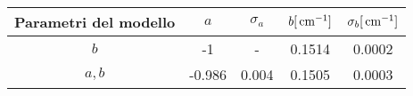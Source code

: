 \begin{tabulary}{\textwidth}{CCCCC}
\toprule
Parametri del modello & $a$  & $\sigma_a$ & $b [\,\mathrm{cm}^{-1}]$ & $\sigma_b [\,\mathrm{cm}^{-1}]$\\ \midrule
$b$ & -1 & - & 0.1514 & 0.0002\\
$a,b$ & -0.986 & 0.004 & 0.1505 & 0.0003\\
\bottomrule
\end{tabulary}

